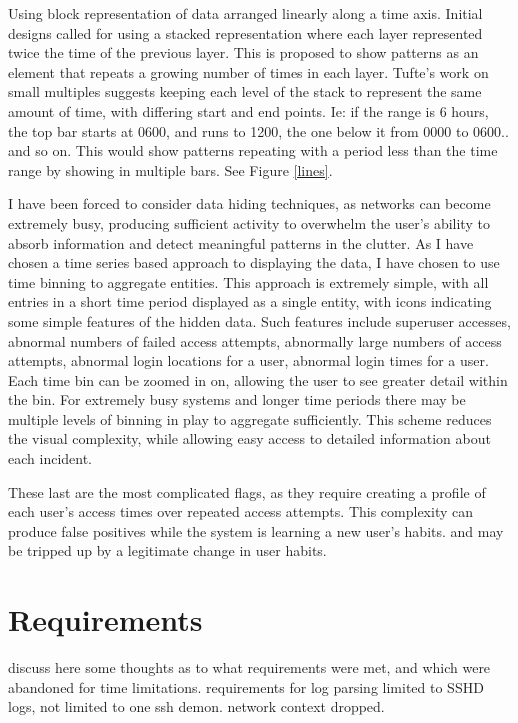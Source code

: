 Using block representation of data arranged linearly along a time axis.
Initial designs called for using a stacked representation where each layer represented twice the time of the previous layer.
This is proposed to show patterns as an element that repeats a growing number of times in each layer.
Tufte's work on small multiples \cite{tufte1983visual} suggests keeping each level of the stack to represent the same amount of time, with differing start and end points. Ie: if the range is 6 hours, the top bar starts at 0600, and runs to 1200, the one below it from 0000 to 0600..  and so on. This would show patterns repeating with a period less than the time range by showing in multiple bars. See Figure \ref{lines}.

I have been forced to consider data hiding techniques, as networks can become extremely busy, producing sufficient activity to overwhelm the user's ability to absorb information and detect meaningful patterns in the clutter. As I have chosen a time series based approach to displaying the data, I have chosen to use time binning to aggregate entities. This approach is extremely simple, with all entries in a short time period displayed as a single entity, with icons indicating some simple features of the hidden data. Such features include superuser accesses, abnormal numbers of failed access attempts, abnormally large numbers of access attempts, abnormal login locations for a user, abnormal login times for a user. Each time bin can be zoomed in on, allowing the user to see greater detail within the bin. For extremely busy systems and longer time periods there may be multiple levels of binning in play to aggregate sufficiently. This scheme reduces the visual complexity, while allowing easy access to detailed information about each incident. 

These last are the most complicated flags, as they require creating a profile of each user's access times over repeated access attempts. This complexity can produce false positives while the system is learning a new user's habits. and may be tripped up by a legitimate change in user habits.

\section{Requirements}
discuss here some thoughts as to what requirements were met, and which were abandoned for time limitations.
requirements for log parsing limited to SSHD logs, not limited to one ssh demon.
network context dropped.



